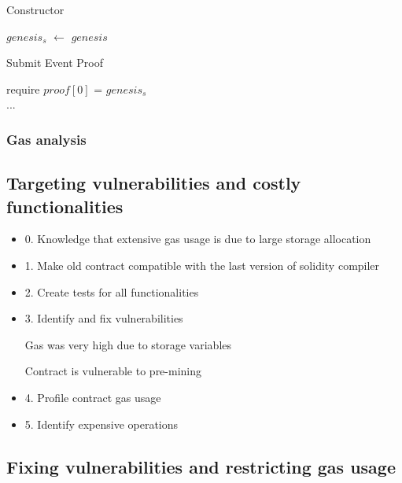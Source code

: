 \begin{algorithm}
    \caption{Constructor}
    \label{algo:avoid_premining_ctor}
    $genesis_{s}$ $\leftarrow$ $genesis$
\end{algorithm}
\vspace{-0.7cm}
\begin{algorithm}
    \caption{Submit Event Proof}
    \label{algo:avoid_premining_submit}
    require $proof[0]$ = $genesis_{s}$ \\
    ...
\end{algorithm}


\subsubsection{Gas analysis}
\subsection{Targeting vulnerabilities and costly functionalities}

\begin{itemize}
    \item
        0. Knowledge that extensive gas usage is due to large storage
        allocation
    \item
        1. Make old contract compatible with the last version of solidity
        compiler
    \item
        2. Create tests for all functionalities
    \item
        3. Identify and fix vulnerabilities

        Gas was very high due to storage variables

        Contract is vulnerable to pre-mining
    \item
        4. Profile contract gas usage
    \item
        5. Identify expensive operations
\end{itemize}

\subsection{Fixing vulnerabilities and restricting gas usage}

